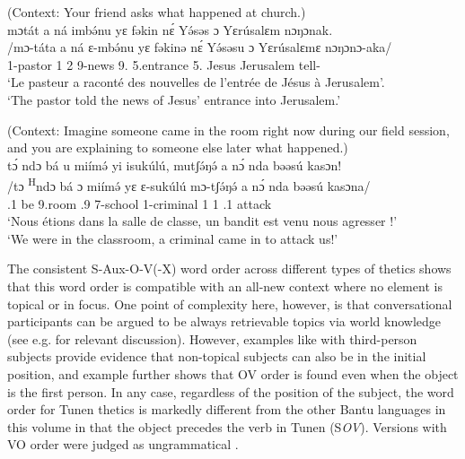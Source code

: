 \documentclass[output=paper,colorlinks,citecolor=brown
]{langscibook}
\begin{document}
\ea
\label{churchthetic}
(Context: Your friend asks what happened at church.) \\
\glll
{\db}mɔtát a ná imbə́nu yɛ fəkin nɛ́ Yə́səs ɔ Yɛrúsalɛm nɔŋɔnak. \\
/mɔ-táta a ná ɛ-mbə́nu yɛ fəkinə nɛ́ Yə́səsu ɔ Yɛrúsalɛmɛ nɔŋɔnɔ-aka/ \\
{\db}1-pastor 1\SM{} \PST{}2{} 9-news 9.\ASS{} 5.entrance 5.\ASS{} Jesus \PREP{} Jerusalem tell-\DUR{} \\
\glt
`Le pasteur a raconté des nouvelles de l'entrée de Jésus à Jerusalem'. \\  `The pastor told the news of Jesus' entrance into Jerusalem.' \jambox*{[DM 166] }
%
%
\z

\ea
\label{criminalattack}
(Context: Imagine someone came in the room right now during our field session, and you are explaining to someone else later what happened.) \\ 
\glll
{\db}tɔ́ ndɔ bá u miímə́ yi isukúlú, mutʃə́ŋə́ a nɔ́ nda bəəsú kasɔn! \\
/tɔ \textsuperscript{H}ndɔ bá ɔ miímə́ yɛ ɛ-sukúlú mɔ-tʃə́ŋə́ a nɔ́ nda bəəsú kasɔna/ \\
{\db}\SM{}.1\PL{} \PRS{} be \PREP{} 9.room \ASS{}.{}9 7-school 1-criminal 1\SM{} \PST{}1{} \VEN{} \PRO{}.1\PL{} attack \\
\glt
`Nous étions dans la salle de classe, un bandit est venu nous agresser !' \\ `We were in the classroom, a criminal came in to attack us!' \jambox*{[EE+EB 1847] }

\z

The consistent S-Aux-O-V(-X) word order across different types of thetics shows that this word order is compatible with an all-new context where no element is topical or in focus. One point of complexity here, however, is that conversational participants can be argued to be always retrievable topics via world knowledge (see e.g. \citealt{Givón1983, Erteschik-Shir2007} for relevant discussion). However, examples like  with third-person subjects provide evidence that non-topical subjects can also be in the initial position, and example  further shows that OV order is found even when the object is the first person. In any case, regardless of the position of the subject, the word order for Tunen thetics is markedly different from the other Bantu languages in this volume in that the object precedes the verb in Tunen (S\textit{OV}). Versions with VO order were judged as ungrammatical .
\end{document}
